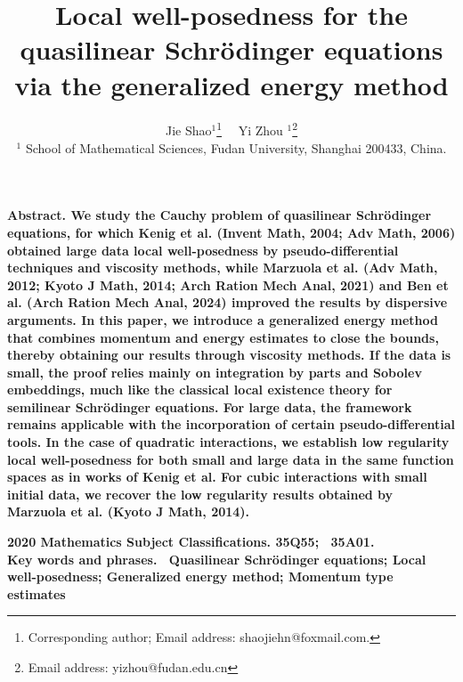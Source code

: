\documentclass[10pt,twoside,a4paper]{article}
\newcommand{\liuhao}{\fontsize{8pt}{\baselineskip}\selectfont}
\numberwithin{equation}{section}\allowdisplaybreaks
\begin{document}
	\title{ {\bf \Large 
			Local well-posedness for the quasilinear  Schr\"odinger equations via the generalized energy method }}
	\author
	{
		{ 
			{	Jie Shao$^{1}$\footnote{Corresponding
					author;
					Email address:
					shaojiehn@foxmail.com. } }   \ \	Yi Zhou $^{1}$\footnote{
				Email address:
				yizhou@fudan.edu.cn } } \\
		{\liuhao $^{1}$  School of Mathematical Sciences, Fudan University, Shanghai 200433, China.}\\
		\date{}
	}
	\date{}
	\maketitle
	
	
	
	
	
	
	
	
	
	
	
	
	
	
	\begin{minipage}{13.5cm}
		\footnotesize \bf Abstract. \rm  \quad 
	 We study the   Cauchy problem of   quasilinear Schr\"odinger equations, for which Kenig et al.  (Invent Math, 2004;  Adv
		Math, 2006)  obtained large data local well-posedness     by  pseudo-differential techniques and viscosity methods, while   Marzuola et al. (Adv Math, 2012;
		Kyoto J Math, 2014; Arch  Ration Mech Anal, 2021) and Ben et al. (Arch  Ration Mech Anal, 2024) improved the results  by  dispersive arguments.  	In this paper, we introduce  a generalized energy method that combines momentum and energy estimates to close the bounds,  thereby obtaining our results through viscosity methods.  If the data is small, the proof relies mainly on integration by parts and Sobolev embeddings, much like the classical local existence theory for semilinear Schrödinger equations. For large   data, the framework remains applicable with the incorporation of certain pseudo-differential tools. In the case of quadratic interactions, we establish low regularity local well-posedness for both small and large   data  in the same function spaces as in works of Kenig et al. For cubic interactions with small initial data, we recover the low regularity results obtained by Marzuola et al. (Kyoto J Math, 2014).
	
		
		
		
		\vspace{10pt}
		
		\bf 2020 Mathematics Subject Classifications. \rm   35Q55; ~35A01. \\
		
		
		\bf Key words and phrases.		
		\rm ~Quasilinear  Schr\"odinger equations; Local well-posedness; Generalized energy method; Momentum type estimates
		
		
	\end{minipage}
	
\end{document}
